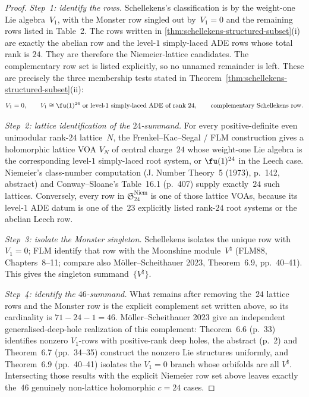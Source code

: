 \begin{proof}
\emph{Step~1: identify the rows.}
Schellekens's classification is by the weight-one Lie algebra~$V_1$,
with the Monster row singled out by~$V_1=0$ and the remaining rows
listed in Table~2. The rows written in
\textup{\ref{thm:schellekens-structured-subset}(i)} are exactly the
abelian row and the level-$1$ simply-laced ADE rows whose total rank is
$24$. They are therefore the Niemeier-lattice candidates. The
complementary row set is listed explicitly, so no unnamed remainder is
left. These are precisely the three membership tests stated in
Theorem~\ref{thm:schellekens-structured-subset}\textup{(}ii\textup{)}:
\[
V_1=0,\qquad
V_1\cong \fu(1)^{24}\ \text{or level-$1$ simply-laced ADE of rank~$24$},
\qquad
\text{complementary Schellekens row}.
\]

\emph{Step~2: lattice identification of the $24$-summand.}
For every positive-definite even unimodular rank-$24$ lattice~$N$, the
Frenkel--Kac--Segal / FLM construction gives a holomorphic lattice VOA
$V_N$ of central charge~$24$ whose weight-one Lie algebra is the
corresponding level-$1$ simply-laced root system, or $\fu(1)^{24}$ in
the Leech case. Niemeier's class-number computation
\textup{(}J. Number Theory~5 \textup{(}1973\textup{)}, p.~142,
abstract\textup{)} and Conway--Sloane's Table~16.1 \textup{(}p.~407\textup{)}
supply exactly~$24$ such lattices. Conversely, every row in
$\mathfrak{S}_{24}^{\mathrm{Niem}}$ is one of those lattice VOAs,
because its level-$1$ ADE datum is one of the~$23$ explicitly listed
rank-$24$ root systems or the abelian Leech row.

\emph{Step~3: isolate the Monster singleton.}
Schellekens isolates the unique row with~$V_1=0$; FLM identify that row
with the Moonshine module~$V^\natural$
\textup{(}FLM88, Chapters~8--11; compare also M\"oller--Scheithauer
2023, Theorem~6.9, pp.~40--41\textup{)}. This gives the singleton
summand~$\{V^\natural\}$.

\emph{Step~4: identify the $46$-summand.}
What remains after removing the~$24$ lattice rows and the Monster row
is the explicit complement set written above, so its cardinality is
$71-24-1=46$. M\"oller--Scheithauer 2023 give an independent
generalised-deep-hole realization of this complement:
Theorem~6.6 \textup{(}p.~33\textup{)} identifies nonzero
$V_1$-rows with positive-rank deep holes, the abstract
\textup{(}p.~2\textup{)} and Theorem~6.7 \textup{(}pp.~34--35\textup{)}
construct the nonzero Lie structures uniformly, and
Theorem~6.9 \textup{(}pp.~40--41\textup{)} isolates the
$V_1=0$ branch whose orbifolds are all
$V^\natural$. Intersecting those results with the explicit
Niemeier row set above leaves exactly the~$46$ genuinely non-lattice
holomorphic $c=24$ cases.


\end{proof}
